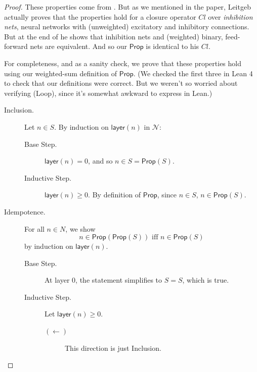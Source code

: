 \documentclass[letterpaper]{article}
\theoremstyle{definition}
\newcommand{\key}[1]{\emph{#1}}
\newcommand{\layer}[1]{\mathsf{layer}(#1)}
\newcommand{\Net}{\mathcal{N}}
\newcommand{\Prop}{\textsf{Prop}}
\begin{document}
\begin{proof}
    These properties come from \cite{leitgeb2001nonmonotonic}.  But as we mentioned in the paper, Leitgeb actually proves that the properties hold for a closure operator $Cl$ over \key{inhibition nets}, neural networks with (unweighted) excitatory and inhibitory connections.  But at the end of \cite{leitgeb2001nonmonotonic} he shows that inhibition nets and (weighted) binary, feed-forward nets are equivalent.  And so our $\Prop$ is identical to his $Cl$.

    For completeness, and as a sanity check, we prove that these properties hold using our weighted-sum definition of $\Prop$.  (We checked the first three in Lean 4 to check that our definitions were correct.  But we weren't so worried about verifying (Loop), since it's somewhat awkward to express in Lean.)

    \begin{description}
        \item[Inclusion.] Let $n \in S$.  By induction on $\layer{n}$ in $\Net$:
        \begin{description}
            \item[Base Step.] $\layer{n} = 0$, and so $n \in S = \Prop(S)$.
            \item[Inductive Step.] $\layer{n} \geq 0$.  By definition of $\Prop$, since $n \in S$, $n \in \Prop(S)$.
        \end{description}

        \item[Idempotence.] For all $n \in N$, we show
        \[ n \in \Prop(\Prop(S)) \mbox{ iff } n \in \Prop(S) \]
        by induction on $\layer{n}$.
        \begin{description}
            \item[Base Step.] At layer $0$, the statement simplifies to $S = S$, which is true.
            \item[Inductive Step.] Let $\layer{n} \geq 0$.
            \begin{description}
                \item[$(\leftarrow)$] This direction is just Inclusion.
                

\end{description}
\end{description}
\end{description}
\end{proof}
\end{document}
